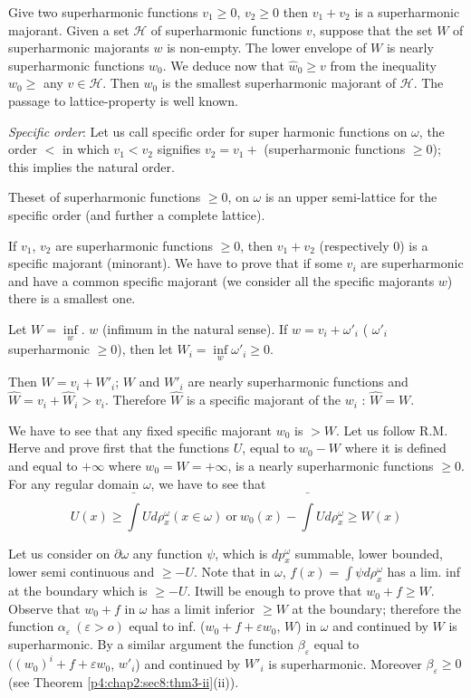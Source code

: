 Give two superharmonic functions $v_1 \ge 0$, $v_2 \ge 0$ then $v_1 +
v_2$ is a superharmonic majorant. Given a set $\mathscr{H}$ of
superharmonic functions $v$, suppose that the set $W$ of superharmonic
majorants $w$ is non-empty. The lower envelope of $W$ is nearly
superharmonic functions $w_0$. We deduce now that $\hat{w}_0 \ge v$
from the inequality $w_0 \ge $ any $v\in \mathscr{H}$. Then $w_0$ is
the smallest superharmonic majorant of $\mathscr{H}$. The passage to
lattice-property is well known. 

\begin{defn}\label{p4:chap4:sec18:def13} %
  {\em Specific order}: Let us call specific order for super harmonic
  functions on $\omega$, the order $<$ in which $v_1 < v_2$ signifies
  $v_2 = v_1 +$ (superharmonic functions $\ge 0$); this implies the
  natural order.  
\end{defn}

\begin{thm}\label{p4:chap4:sec18:thm12}%
  The\pageoriginale set of superharmonic functions $\ge 0$, on $\omega$ is an upper
  semi-lattice for the specific order (and further a complete
  lattice). 
\end{thm}

If $v_1$, $v_2$ are superharmonic functions $\ge 0$, then $v_1 + v_2$
(respectively $0$) is a specific majorant (minorant). We have to prove
that if some $v_i$ are superharmonic and have a common specific
majorant (we consider all the specific majorants $w$) there is a
smallest one. 

Let $W = \inf \limits_{w}$. $w$ (infimum in the natural sense). If $w
= v_i + \omega'_i$ ( $\omega'_i$ superharmonic $\ge 0$), then let $W_i =
\inf\limits_{w} \omega'_i \ge 0$. 

Then $W = v_i + W'_i$; $W$ and $W'_i$ are nearly superharmonic functions
and $\hat{W} = v_i + \hat{W}_i > v_i$. Therefore $\hat{W}$ is a
specific majorant of the $w_i$ : $\hat{W} = W$. 

We have to see that any fixed specific majorant $w_0$ is $> W$. Let us
follow R.M. Herve and prove first that the functions $U$, equal to
$w_0 - W$ where it is defined and equal to $+ \infty$ where $w_0 = W =
+ \infty$, is a nearly superharmonic functions $\ge 0$. For any
regular domain $\omega$, we have to see that 
$$
U(x) \ge \bar{\int} Ud \rho^{\omega}_x (x \in \omega) ~\text{or}~ w_0 (x) -
\bar{\int} Ud \rho^{\omega}_x \geq W (x)  
$$

Let us consider on $\partial \omega$ any function $\psi$, which is
$dp^\omega_x$ summable, lower bounded, lower semi continuous and $\ge
- U$. Note that in $\omega$, $f(x) = \int \psi d \rho^\omega_x$ has a
lim. inf at the boundary which is $\ge - U$. It\pageoriginale will be enough to
prove that $w_0 + f \ge W$. Observe that $w_0 + f$ in $\omega$ has a
limit inferior $\ge W$ at the boundary; therefore the function
$\alpha_{\varepsilon}~(\varepsilon > o)$ equal to inf. ($w_0 + f +
\varepsilon w_0$, $W$) in $\omega$ and continued by $W$ is
superharmonic. By a similar argument the function $\beta_{\varepsilon}
$ equal to $(( w_0)^i + f + \varepsilon w_0$, $w'_i$) and continued by
$W'_i$ is superharmonic. Moreover $\beta_{\varepsilon} \ge 0$ (see
Theorem \ref{p4:chap2:sec8:thm3-ii}(ii)). 

